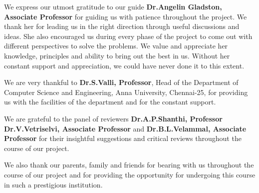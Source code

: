 \par
We express our utmost gratitude to our guide \textbf{Dr.Angelin Gladston, Associate Professor} for guiding us with patience throughout the project. We thank her for leading us in the right direction through useful discussions and ideas. She also encouraged us during every phase of the project to come out with different perspectives to solve the problems. We value and appreciate  her knowledge, principles and ability to bring out the best in us. Without her constant support and appreciation, we could have never done it to this extent.
\par
We are very thankful to \textbf{Dr.S.Valli, Professor}, Head of the Department of Computer Science and Engineering, Anna University, Chennai-25, for providing us with the facilities of the department and for the constant support.
\par
We are grateful to the panel of reviewers \textbf{Dr.A.P.Shanthi, Professor} \textbf{ Dr.V.Vetriselvi,	Associate Professor} and \textbf{Dr.B.L.Velammal, Associate Professor} for their insightful suggestions and critical reviews throughout the course of our project.
\par
We also thank our parents, family and friends for bearing with us throughout the course of our project and for providing the opportunity for undergoing this course in such a prestigious institution.

